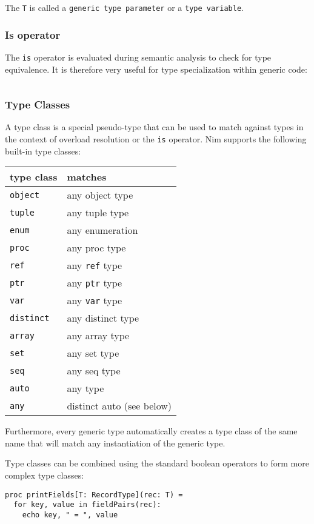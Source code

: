 The \texttt{T} is called a \texttt{generic\ type\ parameter} or a
\texttt{type\ variable}.

\hypertarget{is-operator}{%
\subsubsection{Is operator}\label{is-operator}}

The \texttt{is} operator is evaluated during semantic analysis to check
for type equivalence. It is therefore very useful for type
specialization within generic code:

\begin{verbatim}
\end{verbatim}

\hypertarget{type-classes}{%
\subsubsection{Type Classes}\label{type-classes}}

A type class is a special pseudo-type that can be used to match against
types in the context of overload resolution or the \texttt{is} operator.
Nim supports the following built-in type classes:

\begin{longtable}[]{@{}ll@{}}
\toprule
type class & matches\tabularnewline
\midrule
\endhead
\texttt{object} & any object type\tabularnewline
\texttt{tuple} & any tuple type\tabularnewline
\texttt{enum} & any enumeration\tabularnewline
\texttt{proc} & any proc type\tabularnewline
\texttt{ref} & any \texttt{ref} type\tabularnewline
\texttt{ptr} & any \texttt{ptr} type\tabularnewline
\texttt{var} & any \texttt{var} type\tabularnewline
\texttt{distinct} & any distinct type\tabularnewline
\texttt{array} & any array type\tabularnewline
\texttt{set} & any set type\tabularnewline
\texttt{seq} & any seq type\tabularnewline
\texttt{auto} & any type\tabularnewline
\texttt{any} & distinct auto (see below)\tabularnewline
\bottomrule
\end{longtable}

Furthermore, every generic type automatically creates a type class of
the same name that will match any instantiation of the generic type.

Type classes can be combined using the standard boolean operators to
form more complex type classes:

\begin{verbatim}
proc printFields[T: RecordType](rec: T) =
  for key, value in fieldPairs(rec):
    echo key, " = ", value
\end{verbatim}

